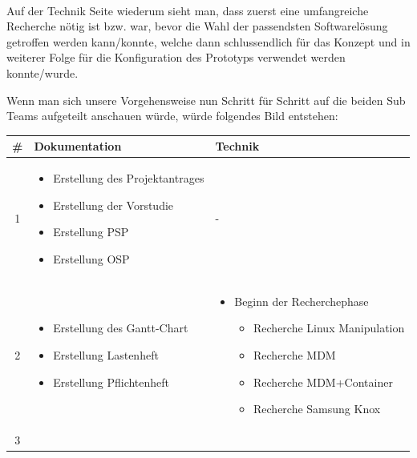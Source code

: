 \paragraph*{}
Auf der Technik Seite wiederum sieht man, dass zuerst eine umfangreiche Recherche nötig ist bzw. war, bevor die Wahl der passendsten Softwarelösung getroffen werden kann/konnte, welche dann schlussendlich für das Konzept und in weiterer Folge für die Konfiguration des Prototyps verwendet werden konnte/wurde.


\newpage

Wenn man sich unsere Vorgehensweise nun Schritt für Schritt auf die beiden Sub Teams aufgeteilt anschauen würde, würde folgendes Bild entstehen:

\begin{table}[H]
	\begin{tabular}{| c | p{6.5cm} | p{7.5cm} |}
		\hline
		\textbf \# & \textbf{Dokumentation} & \textbf{Technik}
		\\\hline %
		1 
		&%
		\begin{itemize}
			\item Erstellung des Projektantrages
			\item Erstellung der Vorstudie
			\item Erstellung PSP
			\item Erstellung OSP
		\end{itemize}
		&%
		-
		\\\hline %
		2
		&%
		\begin{itemize}
			\item Erstellung des Gantt-Chart
			\item Erstellung Lastenheft
			\item Erstellung Pflichtenheft
		\end{itemize}
		&%
		\begin{itemize}
			\item Beginn der Recherchephase
			\begin{itemize}
				\item Recherche Linux Manipulation
				\item Recherche MDM
				\item Recherche MDM+Container
				\item Recherche Samsung Knox
			\end{itemize}
		\end{itemize}
		\\\hline %
		3
		&%

\end{tabular}
\end{table}
